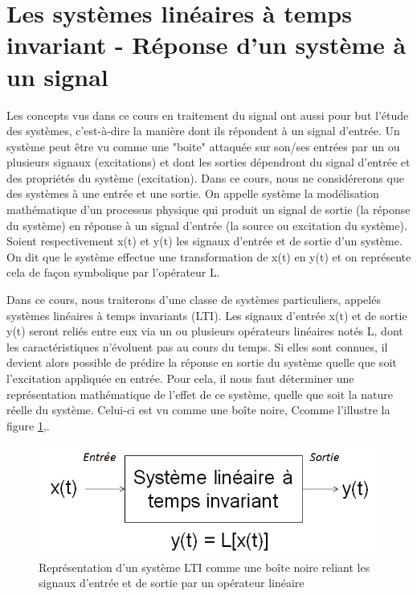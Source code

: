 \documentclass[]{report}
\begin{document}
	\section{Les systèmes linéaires à temps invariant - Réponse d'un système à un signal}
	Les concepts vus dans ce cours en traitement du signal ont aussi pour but l'étude des systèmes, c'est-à-dire la manière dont ils répondent à un signal d'entrée. Un système peut être vu comme une "boite" attaquée sur son/ses entrées par un ou plusieurs signaux (excitations) et dont les sorties dépendront du signal d'entrée et des propriétés du système (excitation). Dans ce cours, nous ne considérerons que des systèmes à une entrée et une sortie. 
	On appelle système la modélisation mathématique d’un processus physique qui produit un signal de sortie (la réponse du système) en réponse à un signal d’entrée (la source ou excitation du système).
	Soient respectivement x(t) et y(t) les signaux d’entrée et de sortie d’un système. On dit que le système effectue une transformation de x(t) en y(t) et on représente cela de façon symbolique par l’opérateur L.

	Dans ce cours, nous traiterons d'une classe de systèmes particuliers, appelés systèmes linéaires à temps invariants (LTI).  Les signaux d'entrée x(t) et de sortie y(t) seront reliés entre eux via un ou plusieurs opérateurs linéaires notés L, dont les caractéristiques n'évoluent pas au cours du temps. Si elles sont connues, il devient alors possible de prédire la réponse en sortie du système quelle que soit l'excitation appliquée en entrée. Pour cela, il nous faut déterminer une représentation mathématique de l'effet de ce système, quelle que soit la nature réelle du système. Celui-ci est vu comme une boîte noire, Ccomme l'illustre la figure \ref{Fig:LTI},.

	\begin{figure}[h!]
		\centering
		\includegraphics[scale=0.5]{images/LTI.jpg} 
		\caption{Représentation d'un système LTI comme une boîte noire reliant les signaux d'entrée et de sortie par un opérateur linéaire}	
		\label{Fig:LTI}
	\end{figure}
	
\end{document}
